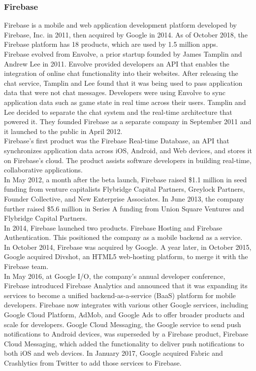 \documentclass[14pt]{report}
\begin{document}
				\subsubsection{Firebase}
					Firebase is a mobile and web application development platform developed by Firebase, Inc. in 2011, then acquired by Google in 2014. As of October 2018, the Firebase platform has 18 products, which are used by 1.5 million apps.\\
				
					Firebase evolved from Envolve, a prior startup founded by James Tamplin and Andrew Lee in 2011. Envolve provided developers an API that enables the integration of online chat functionality into their websites. After releasing the chat service, Tamplin and Lee found that it was being used to pass application data that were not chat messages. Developers were using Envolve to sync application data such as game state in real time across their users. Tamplin and Lee decided to separate the chat system and the real-time architecture that powered it. They founded Firebase as a separate company in September 2011 and it launched to the public in April 2012.\\

					Firebase's first product was the Firebase Real-time Database, an API that synchronizes application data across iOS, Android, and Web devices, and stores it on Firebase's cloud. The product assists software developers in building real-time, collaborative applications.\\

					In May 2012, a month after the beta launch, Firebase raised \$1.1 million in seed funding from venture capitalists Flybridge Capital Partners, Greylock Partners, Founder Collective, and New Enterprise Associates. In June 2013, the company further raised \$5.6 million in Series A funding from Union Square Ventures and Flybridge Capital Partners.\\

					In 2014, Firebase launched two products. Firebase Hosting and Firebase Authentication. This positioned the company as a mobile backend as a service.\\

					In October 2014, Firebase was acquired by Google. A year later, in October 2015, Google acquired Divshot, an HTML5 web-hosting platform, to merge it with the Firebase team.\\

					In May 2016, at Google I/O, the company's annual developer conference, Firebase introduced Firebase Analytics and announced that it was expanding its services to become a unified backend-as-a-service (BaaS) platform for mobile developers. Firebase now integrates with various other Google services, including Google Cloud Platform, AdMob, and Google Ads to offer broader products and scale for developers. Google Cloud Messaging, the Google service to send push notifications to Android devices, was superseded by a Firebase product, Firebase Cloud Messaging, which added the functionality to deliver push notifications to both iOS and web devices. In January 2017, Google acquired Fabric and Crashlytics from Twitter to add those services to Firebase.\\
\end{document}
